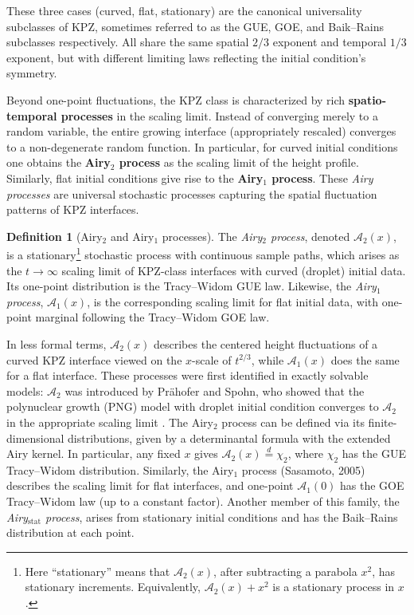 \documentclass[letterpaper,11pt,oneside,reqno]{article}
\numberwithin{equation}{section}
\theoremstyle{definition}
\newtheorem{definition}[proposition]{Definition}
\begin{document}
These three cases (curved, flat, stationary) are the canonical universality subclasses of KPZ, sometimes referred to as the GUE, GOE, and Baik–Rains subclasses respectively. All share the same spatial $2/3$ exponent and temporal $1/3$ exponent, but with different limiting laws reflecting the initial condition's symmetry.

Beyond one-point fluctuations, the KPZ class is characterized by rich \textbf{spatio-temporal processes} in the scaling limit. Instead of converging merely to a random variable, the entire growing interface (appropriately rescaled) converges to a non-degenerate random function. In particular, for curved initial conditions one obtains the \textbf{Airy$_2$ process} as the scaling limit of the height profile. Similarly, flat initial conditions give rise to the \textbf{Airy$_1$ process}. These \emph{Airy processes} are universal stochastic processes capturing the spatial fluctuation patterns of KPZ interfaces.

\begin{definition}[Airy$_2$ and Airy$_1$ processes]
The \emph{Airy$_2$ process}, denoted $\mathcal{A}_2(x)$, is a stationary\footnote{Here “stationary” means that $\mathcal{A}_2(x)$, after subtracting a parabola $x^2$, has stationary increments. Equivalently, $\mathcal{A}_2(x) + x^2$ is a stationary process in $x$.} stochastic process with continuous sample paths, which arises as the $t\to\infty$ scaling limit of KPZ-class interfaces with curved (droplet) initial data. Its one-point distribution is the Tracy–Widom GUE law. Likewise, the \emph{Airy$_1$ process}, $\mathcal{A}_1(x)$, is the corresponding scaling limit for flat initial data, with one-point marginal following the Tracy–Widom GOE law.
\end{definition}

\noindent In less formal terms, $\mathcal{A}_2(x)$ describes the centered height fluctuations of a curved KPZ interface viewed on the $x$-scale of $t^{2/3}$, while $\mathcal{A}_1(x)$ does the same for a flat interface. These processes were first identified in exactly solvable models: $\mathcal{A}_2$ was introduced by Prähofer and Spohn, who showed that the polynuclear growth (PNG) model with droplet initial condition converges to $\mathcal{A}_2$ in the appropriate scaling limit \cite{remenik2023integrable}. The Airy$_2$ process can be defined via its finite-dimensional distributions, given by a determinantal formula with the extended Airy kernel. In particular, any fixed $x$ gives $\mathcal{A}_2(x)\stackrel{d}{=}\chi_2$, where $\chi_2$ has the GUE Tracy–Widom distribution. Similarly, the Airy$_1$ process (Sasamoto, 2005) describes the scaling limit for flat interfaces, and one-point $\mathcal{A}_1(0)$ has the GOE Tracy–Widom law (up to a constant factor). Another member of this family, the \emph{Airy$_{\mathrm{stat}}$ process}, arises from stationary initial conditions and has the Baik–Rains distribution at each point.
\end{document}
